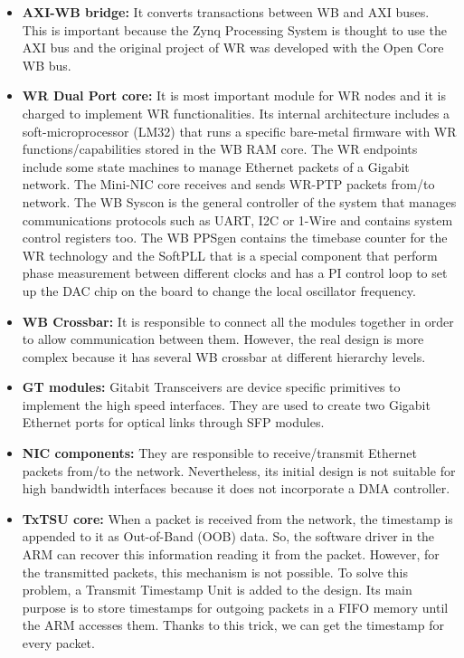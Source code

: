 \begin{itemize}
	\item{\textbf{AXI-WB bridge:} It converts transactions between WB and AXI buses. This is important because the Zynq Processing System is thought to use the AXI bus and the original project of WR was developed with the Open Core WB bus. }
	\item{\textbf{WR Dual Port core:} It is most important module for WR nodes and it is charged to implement WR functionalities. Its internal architecture includes a soft-microprocessor (LM32) that runs a specific bare-metal firmware with WR functions/capabilities stored in the WB RAM core. The WR endpoints include some state machines to manage Ethernet packets of a Gigabit network. The Mini-NIC core receives and sends WR-PTP packets from/to network. The WB Syscon is the general controller of the system that manages communications protocols such as UART, I2C or 1-Wire and contains system control registers too. The WB PPSgen contains the timebase counter for the WR technology and the SoftPLL that is a special component that perform phase measurement between different clocks and has a PI control loop to set up the DAC chip on the board to change the local oscillator frequency. }
	\item{\textbf{WB Crossbar:} It is responsible to connect all the modules together in order to allow communication between them. However, the real design is more complex because it has several WB crossbar at different hierarchy levels. }
	\item{\textbf{GT modules:} Gitabit Transceivers are device specific primitives to implement the high speed interfaces. They are used to create two Gigabit Ethernet ports for optical links through SFP modules.}
	\item{\textbf{NIC components:} They are responsible to receive/transmit Ethernet packets from/to the network. Nevertheless, its initial design is not suitable for high bandwidth interfaces because it does not incorporate a DMA controller. 
	}
	\item{\textbf{TxTSU core:} When a packet is received from the network, the timestamp is appended to it as Out-of-Band (OOB) data. So, the software driver in the ARM can recover this information reading it from the packet. However, for the transmitted packets, this mechanism is not possible. To solve this problem, a Transmit Timestamp Unit is added to the design. Its main purpose is to store timestamps for outgoing packets in a FIFO memory until the ARM accesses them. Thanks to this trick, we can get the timestamp for every packet. 
		
}
\end{itemize}
